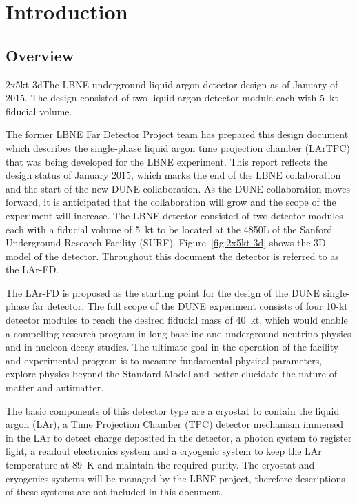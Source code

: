 \chapter{Introduction}

\section{Overview}
\begin{cdrfigure}{2x5kt-3d}{The LBNE underground liquid argon detector design as of January of 2015. The design consisted of two liquid argon detector module each with 5~kt fiducial volume.}
 \end{cdrfigure}

The former LBNE Far Detector Project team has prepared this design document which describes the single-phase liquid argon time projection chamber (LArTPC) that was being developed for the LBNE experiment. This report reflects the design status of January 2015, which marks the end of the LBNE collaboration and the start of the new DUNE collaboration. As the DUNE collaboration moves forward, it is anticipated that the collaboration will grow and the scope of the experiment will increase. The LBNE detector consisted of two detector modules each with a fiducial volume of 5~kt to be located at the 4850L of the Sanford Underground Research Facility (SURF). Figure~\ref{fig:2x5kt-3d} shows the 3D model of the detector. Throughout this document the detector is referred to as the LAr-FD. 

The LAr-FD is proposed as the starting point for the design of the DUNE single-phase far detector. The full scope of the DUNE experiment consists of four 10-kt detector modules to reach the desired fiducial mass of 40~kt, which would enable a compelling research program in long-baseline and underground neutrino physics and in nucleon decay studies. The ultimate goal in the operation of the facility and experimental program is to measure fundamental physical parameters, explore physics beyond the Standard Model and better elucidate the nature of matter and antimatter. 

The basic components of this detector type are a cryostat to contain the liquid argon (LAr),  a  Time Projection Chamber (TPC) detector mechanism immersed in the LAr to detect charge deposited in the detector, a photon system to register light, a readout electronics system and a cryogenic system to keep the LAr temperature at 89~K and maintain the required purity.  The cryostat and cryogenics systems will be managed by the LBNF project, therefore descriptions of these systems are not included in this document. 

